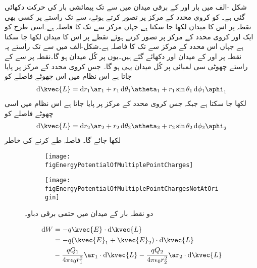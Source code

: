شکل -الف میں بار  اور  کے برقی میدان میں  سے  تک پیمائشی بار  کی حرکت دکھائی گئی ہے۔ کو کروی محدد کے مرکز پر تصور کرتے ہوئے،  سے  تک راستے پر  کسی بھی نقطہ  پر اس کا میدان  لکھا جا سکتا ہے جہاں  مرکز سے   تک کا فاصلہ ہے۔اسی طرح  کو ایک اور کروی محدد کے مرکز پر تصور کرتے ہوئے  نقطے  پر اس کا میدان  لکھا جا سکتا ہے جہاں  اس محدد کے مرکز سے   تک کا فاصلہ ہے۔شکل-الف میں  سے  تک راستے پہ نقطہ  پر  اور  کے میدان  اور  دکھائے گئے ہیں۔یوں  پر کُل میدان  ہو گا۔نقطہ  پر  سے  کے راستے چھوٹی سی لمبائی    پر کُل میدان یہی ہو گا۔ جس کروی محدد کے مرکز پر  پایا جاتا ہے اس نظام میں اس چھوٹے فاصلے کو 
\begin{align}\label{مساوات_توانائی_چھوٹا_فاصلہ_الف}
\dif \kvec{L}=\dif r_1 {\ar}_1+r_1 \dif {\theta}_1 {\atheta}_1+r_1\sin \theta_1 \dif \phi_1 {\aphi}_1 
\end{align}
لکھا جا سکتا ہے جبکہ جس کروی محدد کے مرکز پر  پایا جاتا ہے اس نظام میں اسی چھوٹے فاصلے کو 
\begin{align}\label{مساوات_توانائی_چھوٹا_فاصلہ_ب}
\dif \kvec{L}=\dif r_2 {\ar}_2+r_2 \dif {\theta}_2 {\atheta}_2+r_2\sin \theta_2 \dif \phi_2 {\aphi}_2 
\end{align}
لکھا جائے گا۔ فاصلہ طے کرنے کی خاطر
\begin{figure}
\centering
\begin{subfigure}{0.5\textwidth}
\centering
\texttt{[image: figEnergyPotentialOfMultiplePointCharges]}
\end{subfigure}%
%
\begin{subfigure}{0.5\textwidth}
\centering
\texttt{[image: figEnergyPotentialOfMultiplePointChargesNotAtOrigin]}
\end{subfigure}%
\caption{دو نقطہ بار کے میدان میں حتمی برقی دباو۔}
\label{شکل_توانائی_متعدد_نقطہ_بار_دباو}
\end{figure}
%
\begin{align*}
\dif W&=-q \kvec{E} \cdot \dif \kvec{L}\\
&=-q (\kvec{E}_1+\kvec{E}_2) \cdot \dif \kvec{L}\\
&- \frac{q Q_1}{4\pi \epsilon_0 r_1^2} {\ar}_1 \cdot \dif \kvec{L}- \frac{q Q_2}{4\pi \epsilon_0 r_2^2} {\ar}_2 \cdot \dif \kvec{L}
\end{align*}
